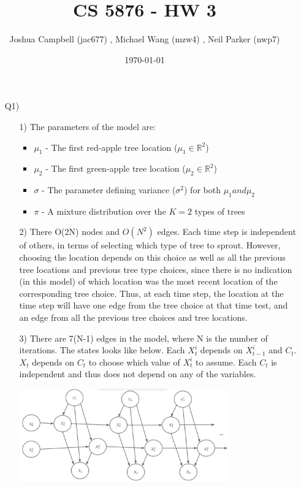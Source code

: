\documentclass[12pt]{article}
\title{CS 5876 - HW 3}
\author{Joshua Campbell (jac677) , Michael Wang (mzw4) , Neil Parker (nwp7) }
\date{\today}
\begin{document}
\maketitle

\begin{enumerate}

\item[Q1)]
	
	\begin{enumerate}
	\item[1)] The parameters of the model are:
		\begin{itemize}
		\item $\mu_1$ - The first red-apple tree location ($ \mu_1 \in \mathbb{R}^2 $)
		\item $\mu_2$ - The first green-apple tree location ($ \mu_2 \in \mathbb{R}^2 $)
		\item $\sigma$ - The parameter defining variance ($ \sigma^2 $) for both $ \mu_1 and \mu_2 $
		\item $\pi$ - A mixture distribution over the $ K=2 $ types of trees
		\end{itemize}
	
	\item[2)] There O(2N) nodes and $O(N^2)$ edges. Each time step is independent of others, in terms of selecting which type of tree to sprout. However, choosing the location depends on this choice as well as all the previous tree locations and previous tree type choices, since there is no indication (in this model) of which location was the most recent location of the corresponding tree choice. Thus, at each time step, the location at the time step will have one edge from the tree choice at that time test, and an edge from all the previous tree choices and tree locations.
	
	\item[3)] There are 7(N-1) edges in the model, where N is the number of iterations. The states looks like below. Each $X_t^i$ depends on $X_{t-1}^i$ and $C_t$. $X_t$ depends on $C_t$ to choose which value of $X_t^i$ to assume. Each $C_t$ is independent and thus does not depend on any of the variables.
		
	\includegraphics[width=0.75\textwidth]{Q1-3.png}
	

\end{enumerate}
\end{enumerate}
\end{document}

